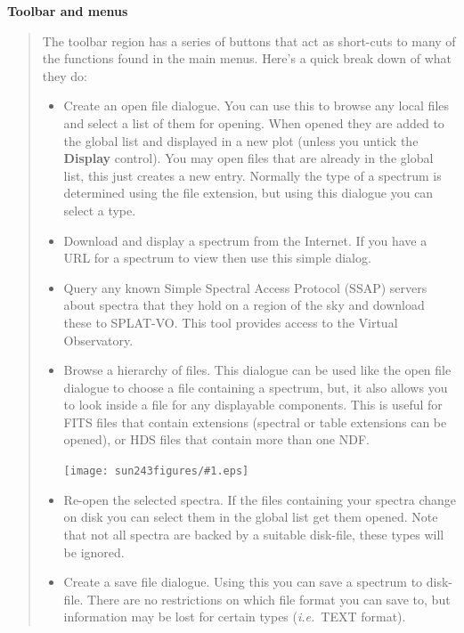\documentclass[twoside,11pt]{article}
\newcommand{\htmladdimg}[1]{}
\newcommand{\latexhtml}[2]{#1}
\renewcommand{\_}{\texttt{\symbol{95}}}
\newcommand{\SPLAT}{\textsf{SPLAT-VO}}
\newcommand{\clippedmainfigure}[1]
{\begin{center}
 \latexhtml{\texttt{[image: sun243\_figures/\#1.eps]}}{\htmladdimg{#1.gif}}
 \end{center}
}
\newcommand{\inline}[1]
        {\latexhtml{\texttt{[image: sun243\_figures/\#1.eps]}}
        {\htmladdimg[align=center]{#1.gif}}}
\newcommand{\labelitem}[1]{\textbf{#1}}
\newcommand{\ie}{\textit{i.e.}}
\newcommand{\subheading}[1]{\textbf{\large{#1}}}
\begin{document}
\subheading{Toolbar and menus}
\begin{quote}
 The toolbar region has a series of buttons that act as short-cuts to
 many of the functions found in the main menus. Here's a quick break
 down of what they do:
 \begin{itemize}

  \item[\inline{openfile}] Create an open file dialogue. You can use this
  to browse any local files and select a list of them for opening. When
  opened they are added to the global list and displayed in a new plot
  (unless you untick the \labelitem{Display} control). You may open files
  that are already in the global list, this just creates a new entry.
  Normally the type of a spectrum is determined using the file extension,
  but using this dialogue you can select a type.

  \item[\inline{location}] Download and display a spectrum from the Internet.
  If you have a URL for a spectrum to view then use this simple dialog.

  \item[\inline{ssap}] Query any known Simple Spectral Access Protocol (SSAP)
  servers about spectra that they hold on a region of the sky and download
  these to \SPLAT. This tool provides access to the Virtual Observatory.

  \item[\inline{browse}] Browse a hierarchy of files. This dialogue can be used
  like the open file dialogue to choose a file containing a spectrum, but,
  it also allows you to look inside a file for any displayable components.
  This is useful for FITS files that contain extensions (spectral or table
  extensions can be opened), or HDS files that contain more than one NDF.

  \clippedmainfigure{treeview}

  \item[\inline{reopen}] Re-open the selected spectra. If the files containing
  your spectra change on disk you can select them in the global list get them
  opened. Note that not all spectra are backed by a suitable disk-file, these
  types will be ignored.

  \item[\inline{savefile}] Create a save file dialogue. Using this you can
  save a spectrum to disk-file. There are no restrictions on which file
  format you can save to, but information may be lost for certain types
  (\ie\ TEXT format).


\end{itemize}
\end{quote}
\end{document}
